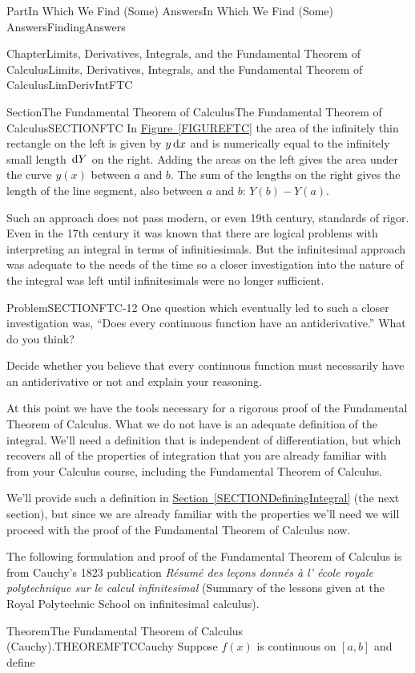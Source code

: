 \documentclass[oneside,10pt,]{book}
\newcommand{\xreffont}{\relax}
\numberwithin{equation}{part}
\newcommand{\dx}[1]{\,{\rm d}#1}
\begin{document}
\begin{partptx}{Part}{In Which We Find (Some) Answers}{}{In Which We Find (Some) Answers}{}{}{FindingAnswers}
\begin{chapterptx}{Chapter}{Limits, Derivatives, Integrals, and the Fundamental Theorem of Calculus}{}{Limits, Derivatives, Integrals, and the Fundamental Theorem of Calculus}{}{}{LimDerivIntFTC}
\begin{sectionptx}{Section}{The Fundamental Theorem of Calculus}{}{The Fundamental Theorem of Calculus}{}{}{SECTIONFTC}
In \hyperref[FIGUREFTC]{Figure~{\xreffont\ref{FIGUREFTC}}} the area of the infinitely thin rectangle on the left is given by \(y\dx{x}\) and is numerically equal to the infinitely small length \(\dx{Y}\) on the right.  Adding the areas on the left gives the area under the curve \(y(x)\) between \(a\) and \(b\).  The sum of the lengths on the right gives the length of the line segment, also between \(a\) and \(b\): \(Y\left(b\right)-Y(a)\).%
\par
Such an approach does not pass modern, or even 19th century, standards of rigor.  Even in the 17th century it was known that there are logical problems with interpreting an integral in terms of infinitiesimals. But the infinitesimal approach was adequate to the needs of the time so a closer investigation into the nature of the integral was left until infinitesimals were no longer sufficient.%
\begin{problem}{Problem}{}{SECTIONFTC-12}%
One question which eventually led to such a closer investigation was, ``Does every continuous function have an antiderivative.'' What do you think?%
\par
Decide whether you believe that every continuous function must necessarily have an antiderivative or not and explain your reasoning.%
\end{problem}
At this point we have the tools necessary for a rigorous proof of the Fundamental Theorem of Calculus. What we do not have is an adequate definition of the integral.    We'll need a definition that is independent of differentiation, but which recovers all of the properties of integration that you are already familiar with from your Calculus course, including the Fundamental Theorem of Calculus.%
\par
We'll provide such a definition in \hyperref[SECTIONDefiningIntegral]{Section~{\xreffont\ref{SECTIONDefiningIntegral}}} (the next section), but since we are already familiar with the properties we'll need we will proceed with the proof of the Fundamental Theorem of Calculus now.%
\par
The following formulation and proof of the Fundamental Theorem of Calculus is from Cauchy's 1823 publication \textit{Résumé des leçons donnés à l' école royale polytechnique sur le calcul infinitesimal} (Summary of the lessons given at the Royal Polytechnic School on infinitesimal calculus).%
\begin{theorem}{Theorem}{The Fundamental Theorem of Calculus (Cauchy).}{}{THEOREMFTCCauchy}%
Suppose \(f\left(x\right)\) is continuous on \([a,b]\) and define%

\end{theorem}
\end{sectionptx}
\end{chapterptx}
\end{partptx}
\end{document}
